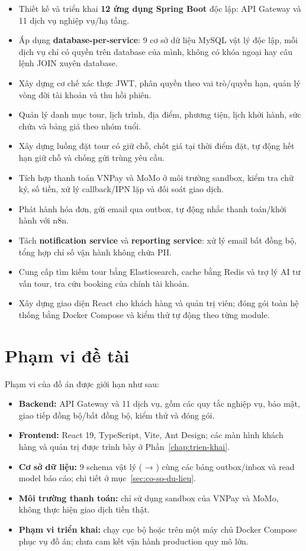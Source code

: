 \begin{itemize}
  \item Thiết kế và triển khai \textbf{12 ứng dụng Spring Boot} độc lập: API Gateway và 11 dịch vụ nghiệp vụ/hạ tầng.
  \item Áp dụng \textbf{database-per-service}: 9 cơ sở dữ liệu MySQL vật lý độc lập, mỗi dịch vụ chỉ có quyền trên database của mình, không có khóa ngoại hay câu lệnh JOIN xuyên database.
  \item Xây dựng cơ chế xác thực JWT, phân quyền theo vai trò/quyền hạn, quản lý vòng đời tài khoản và thu hồi phiên.
  \item Quản lý danh mục tour, lịch trình, địa điểm, phương tiện, lịch khởi hành, sức chứa và bảng giá theo nhóm tuổi.
  \item Xây dựng luồng đặt tour có giữ chỗ, chốt giá tại thời điểm đặt, tự động hết hạn giữ chỗ và chống gửi trùng yêu cầu.
  \item Tích hợp thanh toán VNPay và MoMo ở môi trường sandbox, kiểm tra chữ ký, số tiền, xử lý callback/IPN lặp và đối soát giao dịch.
  \item Phát hành hóa đơn, gửi email qua outbox, tự động nhắc thanh toán/khởi hành với n8n.
  \item Tách \textbf{notification service} và \textbf{reporting service}: xử lý email bất đồng bộ, tổng hợp chỉ số vận hành không chứa PII.
  \item Cung cấp tìm kiếm tour bằng Elasticsearch, cache bằng Redis và trợ lý AI tư vấn tour, tra cứu booking của chính tài khoản.
  \item Xây dựng giao diện React cho khách hàng và quản trị viên; đóng gói toàn hệ thống bằng Docker Compose và kiểm thử tự động theo từng module.
\end{itemize}

\section{Phạm vi đề tài}
\label{sec:pham-vi}

Phạm vi của đồ án được giới hạn như sau:

\begin{itemize}
  \item \textbf{Backend:} API Gateway và 11 dịch vụ, gồm các quy tắc nghiệp vụ, bảo mật, giao tiếp đồng bộ/bất đồng bộ, kiểm thử và đóng gói.
  \item \textbf{Frontend:} React 19, TypeScript, Vite, Ant Design; các màn hình khách hàng và quản trị được trình bày ở Phần~\ref{chap:trien-khai}.
  \item \textbf{Cơ sở dữ liệu:} 9 schema vật lý ( → ) cùng các bảng outbox/inbox và read model báo cáo; chi tiết ở mục~\ref{sec:co-so-du-lieu}.
  \item \textbf{Môi trường thanh toán:} chỉ sử dụng sandbox của VNPay và MoMo, không thực hiện giao dịch tiền thật.
  \item \textbf{Phạm vi triển khai:} chạy cục bộ hoặc trên một máy chủ Docker Compose phục vụ đồ án; chưa cam kết vận hành production quy mô lớn.
\end{itemize}

